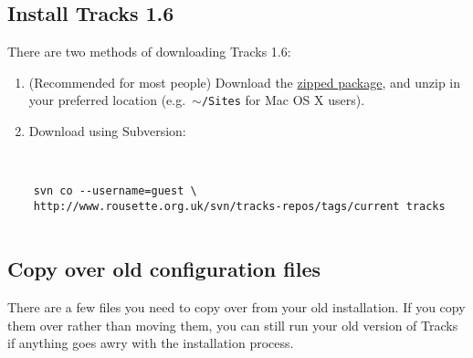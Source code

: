 \documentclass[10pt,twoside]{memoir}
\begin{document}
\subsection{Install Tracks 1.6}
\label{install_upgrade}

There are two methods of downloading Tracks 1.6:


\begin{enumerate}


\item (Recommended for most people) Download the \href{http://www.rousette.org.uk/projects/files/tracks-current.zip}{zipped package}, and unzip in your preferred location (e.g.\ \texttt{\ensuremath{\sim}/Sites} for Mac OS X users).

\item Download using Subversion:
\end{enumerate}

\begin{adjustwidth}{2.5em}{2.5em}
\begin{verbatim}


    svn co --username=guest \ 
    http://www.rousette.org.uk/svn/tracks-repos/tags/current tracks


\end{verbatim}
\end{adjustwidth}

\subsection{Copy over old configuration files}
\label{config_upgrade}

There are a few files you need to copy over from your old installation. If you copy them over rather than moving them, you can still run your old version of Tracks if anything goes awry with the installation process.
\end{document}
